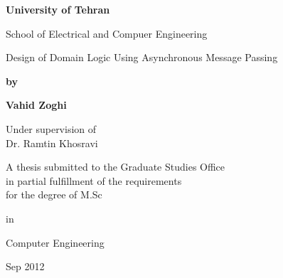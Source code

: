 \documentclass[oneside, a4paper,11pt]{book}
\numberwithin{equation}{chapter}
\numberwithin{table}{chapter}
\numberwithin{figure}{chapter}
\numberwithin{equation}{chapter}
\begin{document}
\begin{latin}
\begin{center}
\vskip 1cm
\large\bfseries
University of Tehran \par
School of \space Electrical and Compuer Engineering
\par
\vskip 1.5cm
\addtolength{\baselineskip}{5mm}
{\titlefont Design of  Domain Logic Using Asynchronous Message Passing} \par
\addtolength{\baselineskip}{-5mm}
\vskip 1cm
{\bfseries by}\par
{\Large\bfseries Vahid Zoghi}\par
\vskip 1cm
Under supervision of \\
{\supervisorfont\Large Dr. Ramtin Khosravi}
\par
\vskip 2cm
{A thesis submitted to the Graduate Studies Office \\ in partial fulfillment of the requirements \\ for the degree of M.Sc \par
in
\par
\large Computer Engineering}
\par
\vskip 1cm
{Sep 2012}
\par
\vfill
\end{center}

\end{latin}
\end{document}
